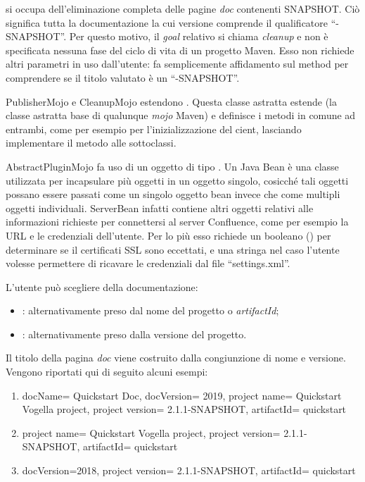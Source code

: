  si occupa dell'eliminazione completa delle pagine \emph{doc} contenenti SNAPSHOT.
Ciò significa tutta la documentazione la cui versione comprende il qualificatore ``-SNAPSHOT''.
Per questo motivo, il \emph{goal} relativo si chiama \emph{cleanup} e non è specificata nessuna fase del ciclo di vita di un progetto Maven.
Esso non richiede altri parametri in uso dall'utente: fa semplicemente affidamento sul method  per comprendere se il titolo valutato è un ``-SNAPSHOT''.

PublisherMojo e CleanupMojo estendono .
Questa classe astratta estende  (la classe astratta base di qualunque \emph{mojo} Maven) e definisce i metodi in comune ad entrambi, come per esempio  per l'inizializzazione del cient, lasciando implementare il metodo  alle sottoclassi.

AbstractPluginMojo fa uso di un oggetto di tipo .
Un Java Bean è una classe utilizzata per incapsulare più oggetti in un oggetto singolo, cosicché tali oggetti possano essere passati come un singolo oggetto bean invece che come multipli oggetti individuali.
ServerBean infatti contiene altri oggetti relativi alle informazioni richieste per connettersi al server Confluence, come per esempio la URL e le credenziali dell'utente.
Per lo più esso richiede un booleano () per determinare se il certificati SSL sono eccettati, e una stringa  nel caso l'utente volesse permettere di ricavare le credenziali dal file ``settings.xml''.



L'utente può scegliere della documentazione:
	\begin{itemize}
		\item {}: alternativamente preso dal nome del progetto o \emph{artifactId};
		\item {}: alternativamente preso dalla versione del progetto.
	\end{itemize} 
Il titolo della pagina \emph{doc} viene costruito dalla congiunzione di nome e versione.
Vengono riportati qui di seguito alcuni esempi:
	\begin{enumerate}
		\item docName= Quickstart Doc, docVersion= 2019, project name= Quickstart Vogella project, project version= 2.1.1-SNAPSHOT, artifactId= quickstart
		\item project name= Quickstart Vogella project, project version= 2.1.1-SNAPSHOT,  artifactId= quickstart
		\item docVersion=2018, project version= 2.1.1-SNAPSHOT,  artifactId= quickstart
	\end{enumerate}

